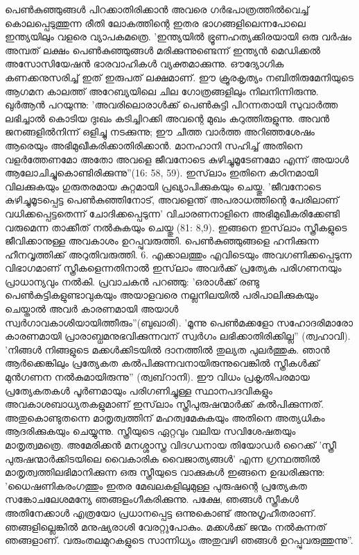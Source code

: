 പെണ്‍കുഞ്ഞുങ്ങള്‍ പിറക്കാതിരിക്കാന്‍ അവരെ ഗര്‍ഭപാത്രത്തില്‍വെച്ച് കൊലപ്പെടുത്തുന്ന രീതി ലോകത്തിന്റെ ഇതര ഭാഗങ്ങളിലെന്നപോലെ ഇന്ത്യയിലും വളരെ വ്യാപകമത്രെ. 'ഇന്ത്യയില്‍ ഭ്രൂണഹത്യക്കിരയായി ഒരു വര്‍ഷം അമ്പത് ലക്ഷം പെണ്‍കുഞ്ഞുങ്ങള്‍ മരിക്കുന്നുണ്ടെന്ന് ഇന്ത്യന്‍ മെഡിക്കല്‍ അസോസിയേഷന്‍ ഭാരവാഹികള്‍ വ്യക്തമാക്കുന്നു. ഔദ്യോഗിക കണക്കനുസരിച്ച് ഇത് ഇരുപത് ലക്ഷമാണ്.
ഈ ക്രൂരകൃത്യം നബിതിരുമേനിയുടെ ആഗമന കാലത്ത് അറേബ്യയിലെ ചില ഗോത്രങ്ങളിലും നിലനിന്നിരുന്നു. ഖുര്‍ആന്‍ പറയുന്നു: 'അവരിലൊരാള്‍ക്ക് പെണ്‍കുട്ടി പിറന്നതായി സുവാര്‍ത്ത ലഭിച്ചാല്‍ കൊടിയ ദുഃഖം കടിച്ചിറക്കി അവന്റെ മുഖം കറുത്തിരുളുന്നു. അവന്‍ ജനങ്ങളില്‍നിന്ന് ഒളിച്ചു നടക്കുന്നു; ഈ ചീത്ത വാര്‍ത്ത അറിഞ്ഞശേഷം ആരെയും അഭിമുഖീകരിക്കാതിരിക്കാന്‍. മാനഹാനി സഹിച്ച് അതിനെ വളര്‍ത്തേണമോ അതോ അവളെ ജീവനോടെ കുഴിച്ചുമൂടേണമോ എന്ന് അയാള്‍ ആലോചിച്ചുകൊണ്ടിരിക്കുന്നു''(16: 58, 59).
ഇസ്‌ലാം ഇതിനെ കഠിനമായി വിലക്കുകയും ഗുരുതരമായ കുറ്റമായി പ്രഖ്യാപിക്കുകയും ചെയ്തു. 'ജീവനോടെ കുഴിച്ചുമൂടപ്പെട്ട പെണ്‍കുഞ്ഞിനോട്, അവളെന്ത് അപരാധത്തിന്റെ പേരിലാണ് വധിക്കപ്പെട്ടതെന്ന് ചോദിക്കപ്പെടുന്ന' വിചാരണനാളിനെ അഭിമുഖീകരിക്കേണ്ടി വരുമെന്ന താക്കീത് നല്‍കുകയും ചെയ്തു (81: 8,9).
ഇങ്ങനെ ഇസ്‌ലാം സ്ത്രീകളുടെ ജീവിക്കാനുള്ള അവകാശം ഉറപ്പുവരുത്തി. പെണ്‍കുഞ്ഞുങ്ങളെ ഹനിക്കുന്ന ഹീനവൃത്തിക്ക് അറുതിവരുത്തി.
6. എക്കാലത്തും എവിടെയും അവഗണിക്കപ്പെടുന്ന വിഭാഗമാണ് സ്ത്രീകളെന്നതിനാല്‍ ഇസ്‌ലാം അവര്‍ക്ക് പ്രത്യേക പരിഗണനയും പ്രാധാന്യവും നല്‍കി. പ്രവാചകന്‍ പറഞ്ഞു: 'ഒരാള്‍ക്ക് രണ്ടു പെണ്‍കുട്ടികളുണ്ടാവുകയും അയാളവരെ നല്ലനിലയില്‍ പരിപാലിക്കുകയും ചെയ്താല്‍ അവര്‍ കാരണമായി അയാള്‍ സ്വര്‍ഗാവകാശിയായിത്തീരും''(ബുഖാരി).
'മൂന്നു പെണ്‍മക്കളോ സഹോദരിമാരോ കാരണമായി പ്രാരാബ്ധമനുഭവിക്കുന്നവന് സ്വര്‍ഗം ലഭിക്കാതിരിക്കില്ല'' (ത്വഹാവി). 'നിങ്ങള്‍ നിങ്ങളുടെ മക്കള്‍ക്കിടയില്‍ ദാനത്തില്‍ തുല്യത പുലര്‍ത്തുക. ഞാന്‍ ആര്‍ക്കെങ്കിലും പ്രത്യേകത കല്‍പിക്കുന്നവനായിരുന്നുവെങ്കില്‍ സ്ത്രീകള്‍ക്ക് മുന്‍ഗണന നല്‍കുമായിരുന്നു'' (ത്വബ്‌റാനി).
ഈ വിധം പ്രകൃതിപരമായ പ്രത്യേകതകള്‍ പൂര്‍ണമായും പരിഗണിച്ചുള്ള സ്ഥാനപദവികളും അവകാശബാധ്യതകളുമാണ് ഇസ്‌ലാം സ്ത്രീപുരുഷന്മാര്‍ക്ക് കല്‍പിക്കുന്നത്. അതുകൊണ്ടുതന്നെ മാതൃത്വത്തിന് മഹത്വമേകുകയും അതിനെ അത്യധികം ആദരിക്കുകയും ചെയ്യുന്നു. സ്ത്രീയുടെ ഏറ്റവും വലിയ സവിശേഷതയും മാതൃത്വമത്രെ. അമേരിക്കന്‍ മനശ്ശാസ്ത്ര വിദഗ്ധനായ തിയോഡര്‍ റൈക്ക് 'സ്ത്രീ പുരുഷന്മാര്‍ക്കിടയിലെ വൈകാരിക വൈജാത്യങ്ങള്‍' എന്ന ഗ്രന്ഥത്തില്‍ മാതൃത്വത്തിലഭിമാനിക്കുന്ന ഒരു സ്ത്രീയുടെ വാക്കുകള്‍ ഇങ്ങനെ ഉദ്ധരിക്കുന്നു: 'ധൈഷണികരംഗത്തും ഇതര മേഖലകളിലുമുള്ള പുരുഷന്റെ പ്രത്യേകത സങ്കോചലേശമന്യേ ഞങ്ങളംഗീകരിക്കുന്നു. പക്ഷേ, ഞങ്ങള്‍ സ്ത്രീകള്‍ അതിനേക്കാള്‍ എത്രയോ പ്രധാനപ്പെട്ട ഒന്നുകൊണ്ട് അനുഗൃഹീതരാണ്. ഞങ്ങളില്ലെങ്കില്‍ മനുഷ്യരാശി വേരറ്റുപോകും. മക്കള്‍ക്ക് ജന്മം നല്‍കുന്നത് ഞങ്ങളാണ്. വരുംതലമുറകളുടെ സാന്നിധ്യം അതുവഴി ഞങ്ങള്‍ ഉറപ്പുവരുത്തുന്നു''.
